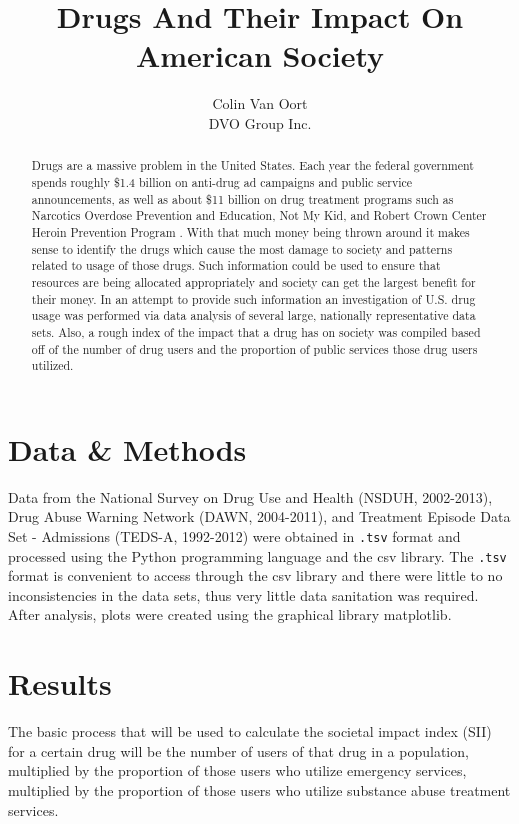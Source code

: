 \documentclass[a4 paper]{article}
\title{Drugs And Their Impact On American Society}
\author{Colin Van Oort\\DVO Group Inc.}
\date{\vspace{-5ex}}
\begin{document}
\maketitle


\begin{abstract}
\noindent Drugs are a massive problem in the United States. Each year the federal government spends roughly \$1.4 billion on anti-drug ad campaigns and public service announcements, as well as about \$11 billion on drug treatment programs such as Narcotics Overdose Prevention and Education, Not My Kid, and Robert Crown Center Heroin Prevention Program \cite{Anti-Drug Money}. With that much money being thrown around it makes sense to identify the drugs which cause the most damage to society and patterns related to usage of those drugs. Such information could be used to ensure that resources are being allocated appropriately and society can get the largest benefit for their money. In an attempt to provide such information an investigation of U.S. drug usage was performed via data analysis of several large, nationally representative data sets. Also, a rough index of the impact that a drug has on society was compiled based off of the number of drug users and the proportion of public services those drug users utilized.
\end{abstract}


\section*{Data \& Methods}

Data from the National Survey on Drug Use and Health (NSDUH, 2002-2013), Drug Abuse Warning Network (DAWN, 2004-2011), and Treatment Episode Data Set - Admissions (TEDS-A, 1992-2012) were obtained in \texttt{.tsv} format and processed using the Python programming language and the csv library. The \texttt{.tsv} format is convenient to access through the csv library and there were little to no inconsistencies in the data sets, thus very little data sanitation was required. After analysis, plots were created using the graphical library matplotlib.


\section*{Results}
The basic process that will be used to calculate the societal impact index (SII) for a certain drug will be the number of users of that drug in a population, multiplied by the proportion of those users who utilize emergency services, multiplied by the proportion of those users who utilize substance abuse treatment services.\\
\end{document}
